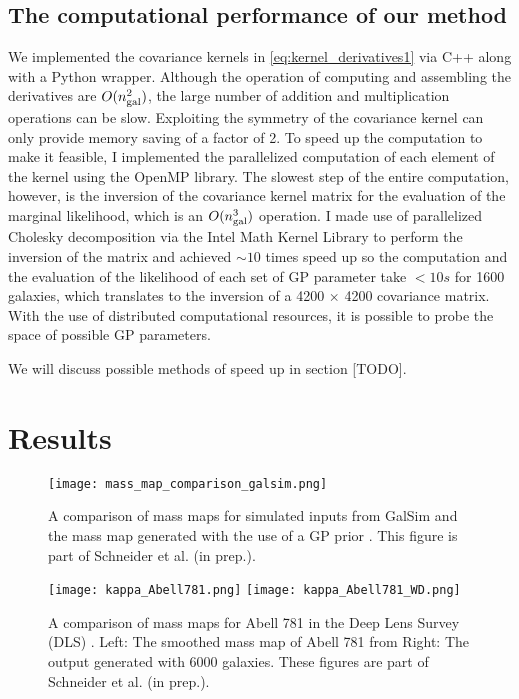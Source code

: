 \subsection{The computational performance of our method}
We implemented the covariance kernels in \ref{eq:kernel_derivatives1}
via {\sc C++} along with a {\sc Python} wrapper. 
Although the operation of computing and assembling the
derivatives are $O(n_{\rm gal}^2)$, the large number of addition and 
multiplication operations can be slow.
Exploiting the symmetry of the covariance kernel can only provide 
memory saving of a factor of 2.
To speed up the computation to make it feasible, 
I implemented the parallelized computation of each element of the kernel using 
the {\sc OpenMP} library. The slowest step of the entire computation, however, 
is the inversion of the
covariance kernel matrix for the evaluation of the marginal likelihood, 
which is an $O(n_{\rm gal}^3)$ operation. 
I made use of parallelized Cholesky decomposition via the {\sc Intel Math
Kernel Library} to perform the inversion of the matrix and achieved $\sim10$ 
times speed up so the
computation and the evaluation of the likelihood of each set of GP parameter
take $< 10s$ for 1600 galaxies, which translates to 
the inversion of a 4200 $\times$ 4200 covariance matrix.
With the use of distributed computational resources, it is possible 
to probe the space of possible GP parameters.  


We will discuss possible methods
of speed up in section [TODO].

\section{Results}
 \begin{figure}
	\centering
	\texttt{[image: mass\_map\_comparison\_galsim.png]}
	\caption{A comparison of mass maps for simulated inputs from {\sc GalSim} and
	the mass map generated with the use of a GP prior \label{fig:Galsim_massmaps}. 
	This figure is part of Schneider et al. (in prep.).
}
\end{figure}

\begin{figure}
	\centering
	\texttt{[image: kappa\_Abell781.png]}
	\texttt{[image: kappa\_Abell781\_WD.png]}
	\caption{A comparison of mass maps for Abell 781 in the Deep Lens Survey (DLS) 
		\label{fig:Abell781_massmap}.  Left: The smoothed mass map of Abell 781 from 
		Right: The output generated with 6000
		galaxies. 
	These figures are part of Schneider et al. (in prep.).
}
\end{figure}



